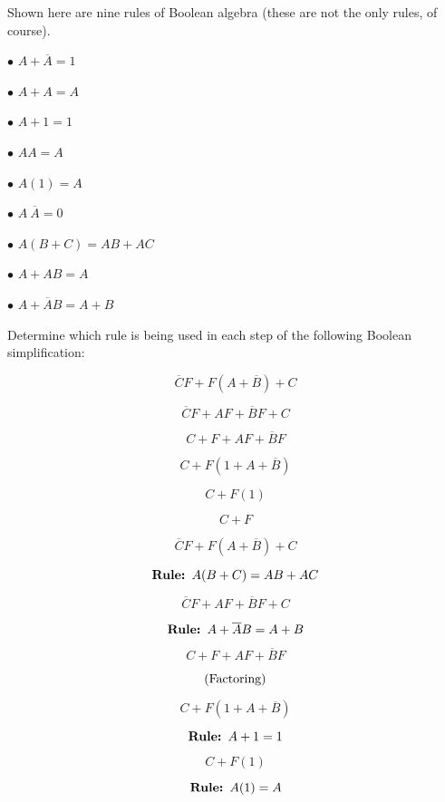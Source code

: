 

Shown here are nine rules of Boolean algebra (these are not the only rules, of course).  

\medskip
\item{$\bullet$} $A + \overline{A} = 1$
\item{$\bullet$} $A + A = A$
\item{$\bullet$} $A + 1 = 1$
\item{$\bullet$} $AA = A$
\item{$\bullet$} $A(1) = A$
\item{$\bullet$} $A \> \overline{A} = 0$
\item{$\bullet$} $A(B + C) = AB + AC$
\item{$\bullet$} $A + AB = A$
\item{$\bullet$} $A + \overline{A}B = A + B$
\medskip

Determine which rule is being used in each step of the following Boolean simplification:

$$\overline{C}F + F(A + \overline{B}) + C$$

$$\overline{C}F + AF + \overline{B}F + C$$

$$C + F + AF + \overline{B}F$$

$$C + F(1 + A + \overline{B})$$

$$C + F(1)$$

$$C + F$$







$$\overline{C}F + F(A + \overline{B}) + C$$

$$\hbox{\bf Rule: } A(B + C) = AB + AC$$

$$\overline{C}F + AF + \overline{B}F + C$$

$$\hbox{\bf Rule: } A + \overline{A}B = A + B$$

$$C + F + AF + \overline{B}F$$

$$\hbox{(Factoring)}$$

$$C + F(1 + A + \overline{B})$$

$$\hbox{\bf Rule: } A + 1 = 1$$

$$C + F(1)$$

$$\hbox{\bf Rule: } A(1) = A$$

